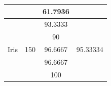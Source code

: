 \documentclass[12pt]{article}
\begin{document}
\begin{table}[]
\begin{tabular}{|c|c|c|c|}
		&                         & 61.7936                                                                                          &                             \\ \hline
		\multirow{5}{*}{Iris}                & \multirow{5}{*}{150}    & 93.3333                                                                                          & \multirow{5}{*}{95.33334}   \\ \cline{3-3}
		&                         & 90                                                                                               &                             \\ \cline{3-3}
		&                         & 96.6667                                                                                          &                             \\ \cline{3-3}
		&                         & 96.6667                                                                                          &                             \\ \cline{3-3}
		&                         & 100                                                                                              &                             \\ \hline
	\end{tabular}
\end{table}
\end{document}
